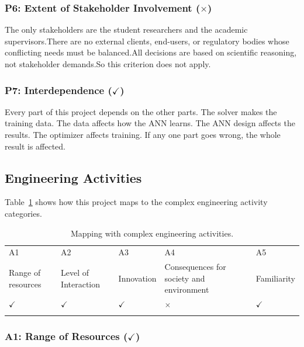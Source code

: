\subsubsection{P6: Extent of Stakeholder Involvement ($\times$)}

The only stakeholders are the student researchers and the academic supervisors.There are no external clients, end-users, or regulatory bodies whose conflicting needs must be balanced.All decisions are based on scientific reasoning, not stakeholder demands.So this criterion does not apply.

\subsubsection{P7: Interdependence ($\checkmark$)}

Every part of this project depends on the other parts. The solver makes the training data. The data affects how the ANN learns. The ANN design affects the results. The optimizer affects training. If any one part goes wrong, the whole result is affected.


\subsection{Engineering Activities}

Table~\ref{tab:e_act} shows how this project maps to the complex engineering activity categories.

\begin{center}
    \begin{table}[ht]
        \centering
        \caption{Mapping with complex engineering activities.}
        \begin{tabular}{|p{}|p{}|p{}|p{}|p{}|}
        \hline
        A1& A2& A3& A4& A5\\
        Range of resources & Level of Interaction & Innovation & Consequences for society and environment & Familiarity\\
        \hline 
        $\checkmark$ & $\checkmark$ & $\checkmark$ & $\times$ & $\checkmark$\\
        &&&&\\
        \hline 
        \end{tabular}
        \label{tab:e_act}
    \end{table}
\end{center}

\subsubsection{A1: Range of Resources ($\checkmark$)}

